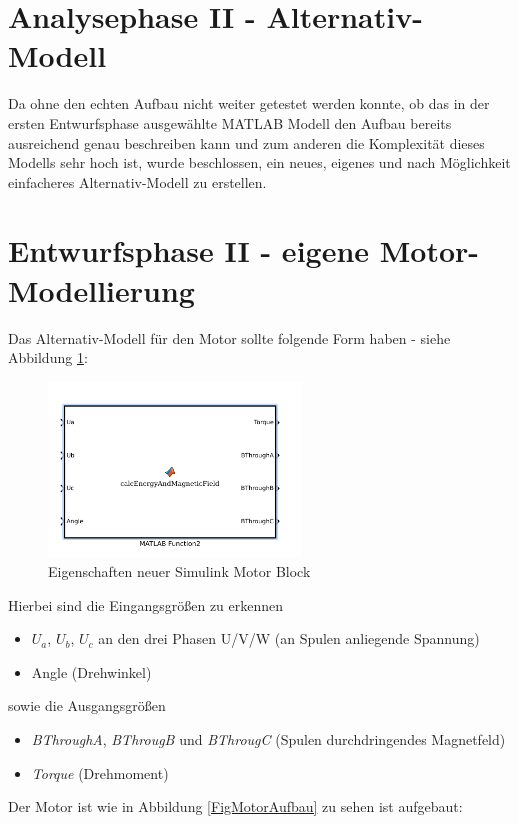 \section{Analysephase II - Alternativ-Modell}
Da ohne den echten Aufbau nicht weiter getestet werden konnte, ob das in der ersten Entwurfsphase ausgewählte MATLAB Modell den Aufbau bereits ausreichend genau beschreiben kann und zum anderen die Komplexität dieses Modells sehr hoch ist, wurde beschlossen, ein neues, eigenes und nach Möglichkeit einfacheres Alternativ-Modell zu erstellen.

\section{Entwurfsphase II - eigene Motor-Modellierung}
Das Alternativ-Modell für den Motor sollte folgende Form haben - siehe Abbildung \ref{FigMotorBlock}:

\begin{figure}[htbp]
	\centering
	\includegraphics[width=0.6\textwidth]{./sim/pictures/matlabBox.png}
	\caption{Eigenschaften neuer Simulink Motor Block}
	\label{FigMotorBlock}
\end{figure}
Hierbei sind die Eingangsgrößen zu erkennen
\begin{itemize}
	\item $U_a$, $U_b$, $U_c$ an den drei Phasen U/V/W (an Spulen anliegende Spannung)
	\item Angle (Drehwinkel)
\end{itemize}
sowie die Ausgangsgrößen
\begin{itemize}
	\item \textit{BThroughA}, \textit{BThrougB} und \textit{BThrougC} (Spulen durchdringendes Magnetfeld)
	\item \textit{Torque} (Drehmoment)
\end{itemize}

\vspace{1cm}
Der Motor ist wie in Abbildung \ref{FigMotorAufbau} zu sehen ist aufgebaut:

